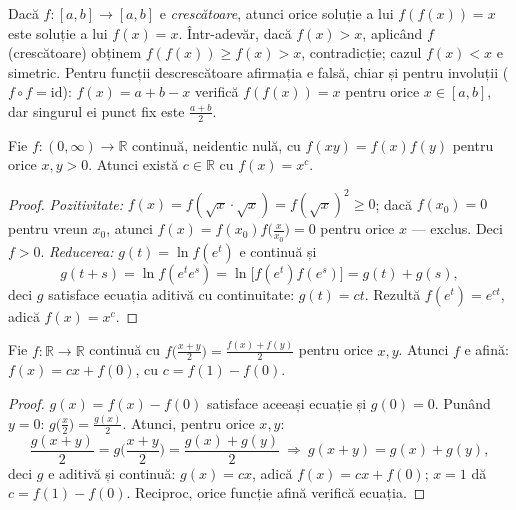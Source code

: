 \begin{obs}
Dacă $f:[a,b]\to[a,b]$ e \emph{crescătoare}, atunci orice soluție a lui $f(f(x))=x$ este soluție a lui $f(x)=x$. Într-adevăr, dacă $f(x)>x$, aplicând $f$ (crescătoare) obținem $f(f(x))\ge f(x)>x$, contradicție; cazul $f(x)<x$ e simetric.
Pentru funcții descrescătoare afirmația e falsă, chiar și pentru involuții ($f\circ f=\mathrm{id}$): $f(x)=a+b-x$ verifică $f(f(x))=x$ pentru orice $x\in[a,b]$, dar singurul ei punct fix este $\frac{a+b}2$.
\end{obs}



\begin{teorema}
Fie $f:(0,\infty)\to\mathbb{R}$ continuă, neidentic nulă, cu $f(xy)=f(x)f(y)$ pentru orice $x,y>0$. Atunci există $c\in\mathbb{R}$ cu $f(x)=x^c$.
\end{teorema}
\begin{proof}
\emph{Pozitivitate:} $f(x)=f(\sqrt x\cdot\sqrt x)=f(\sqrt x)^2\ge0$; dacă $f(x_0)=0$ pentru vreun $x_0$, atunci $f(x)=f(x_0)f\big(\frac{x}{x_0}\big)=0$ pentru orice $x$ --- exclus. Deci $f>0$.
\emph{Reducerea:} $g(t)=\ln f(e^t)$ e continuă și
\[
g(t+s)=\ln f(e^te^s)=\ln\big[f(e^t)f(e^s)\big]=g(t)+g(s),
\]
deci $g$ satisface ecuația aditivă cu continuitate: $g(t)=ct$. Rezultă $f(e^t)=e^{ct}$, adică $f(x)=x^c$.
\end{proof}

\begin{teorema}
Fie $f:\mathbb{R}\to\mathbb{R}$ continuă cu $f\big(\frac{x+y}{2}\big)=\frac{f(x)+f(y)}{2}$ pentru orice $x,y$. Atunci $f$ e afină: $f(x)=cx+f(0)$, cu $c=f(1)-f(0)$.
\end{teorema}
\begin{proof}
$g(x)=f(x)-f(0)$ satisface aceeași ecuație și $g(0)=0$. Punând $y=0$: $g\big(\frac x2\big)=\frac{g(x)}2$. Atunci, pentru orice $x,y$:
\[
\frac{g(x+y)}{2}=g\Big(\frac{x+y}{2}\Big)=\frac{g(x)+g(y)}{2}
\ \Longrightarrow\ g(x+y)=g(x)+g(y),
\]
deci $g$ e aditivă și continuă: $g(x)=cx$, adică $f(x)=cx+f(0)$; $x=1$ dă $c=f(1)-f(0)$. Reciproc, orice funcție afină verifică ecuația.
\end{proof}

